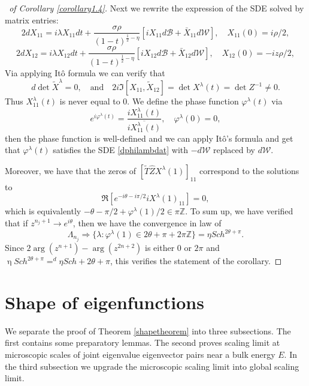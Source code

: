 \documentclass[12pt, reqno]{amsart}
\theoremstyle{definition}
\theoremstyle{remark}
\numberwithin{equation}{section}
\begin{document}
\begin{proof}[\proofname\ of Corollary \ref{corollary1.4}]
Next we rewrite the expression of the SDE solved by matrix entries:
\begin{equation}
   2dX_{11}=i\lambda X_{11}dt+\frac{\sigma\rho}{(1-t)^{\frac{1}{2}-\eta}}[i X_{11}d\mathcal{B}+\bar{X}_{11}d\mathcal{W}],\quad X_{11}(0)=i\rho/2, 
\end{equation}
\begin{equation}
    2dX_{12}=i\lambda X_{12}dt+\frac{\sigma\rho}{(1-t)^{\frac{1}{2}-\eta}}[iX_{12}d\mathcal{B}+\bar{X}_{12}d\mathcal{W}],\quad X_{12}(0)=-iz\rho/2,
\end{equation} Via applying Itô formula we can verify that 
$$
d\det \tilde{X}^\lambda=0,\quad \text{and}\quad 2i\Im[X_{11},\tilde{X}_{   12}]=\det X^\lambda(t)=\det Z^{-1}\neq 0.
$$Thus $X_{11}^\lambda(t)$ is never equal to 0.
   We define the phase function $\varphi^\lambda(t)$ via
    $$
e^{i\varphi^\lambda(t)}=\frac{iX_{11}^\lambda(t)}{\overline{iX_{11}^\lambda(t)}},\quad \varphi^\lambda(0)=0,$$ then the phase function is well-defined and we can apply Itô's formula and get that $\varphi^\lambda(t)$ satisfies the SDE \eqref{dphilambdat} with $-d\mathcal{W}$ replaced by $d\mathcal{W}$.



Moreover, we have that the zeros of $[\tilde{T}\hat{Z}X^\lambda(1)]_{11}$ correspond to the solutions to $$
\Re[e^{-i\theta-i\pi/2}iX^\lambda(1)_{11}]=0,
$$ which is equivalently $-\theta-\pi/2+\varphi^\lambda(1)/2\in\pi\mathbb{Z}$. To sum up, we have verified that if $z^{n_j+1}\to e^{i\theta}$, then we have the convergence in law of  
$$
\Lambda_{n_j}\Rightarrow  \{\lambda:\varphi^{\lambda}(1)\in 2\theta+\pi+2\pi\mathbb{Z}\}=\eta Sch^{2\theta+\pi}.$$
Since $2\arg(z^{n+1})-\arg(z^{2n+2})$ is either 0 or $2\pi$ and $\operatorname\eta{Sch}^{2\theta+\pi}=^d \eta{Sch}+2\theta+\pi$, this verifies the statement of the corollary.
\end{proof}







\section{Shape of eigenfunctions}\label{section5}

We separate the proof of Theorem \ref{shapetheorem} into three subsections. The first contains some preparatory lemmas. The second proves scaling limit at microscopic scales of joint eigenvalue eigenvector pairs near a bulk energy $E$. In the third subsection we upgrade the microscopic scaling limit into global scaling limit.
\end{document}
